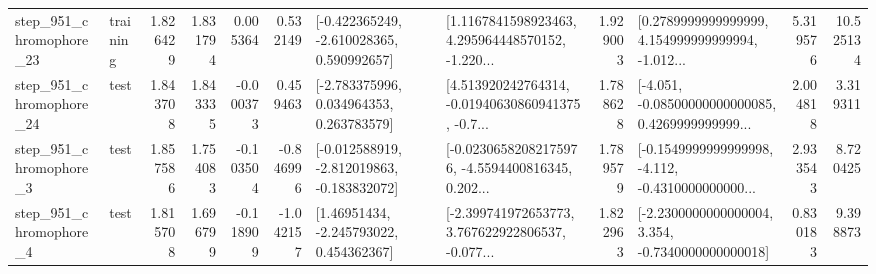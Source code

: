 \begin{tabular}{llrrrrllrlrr}
  step\_951\_chromophore\_23 &  training &      1.826429 &    1.831794 &      0.005364 &  0.532149 &   [-0.422365249, -2.610028365, 0.590992657] &  [1.1167841598923463, 4.295964448570152, -1.220... &       1.929003 &  [0.2789999999999999, 4.154999999999994, -1.012... &            5.319576 &         10.525134 \\
  step\_951\_chromophore\_24 &      test &      1.843708 &    1.843335 &     -0.000373 &  0.459463 &    [-2.783375996, 0.034964353, 0.263783579] &  [4.513920242764314, -0.01940630860941375, -0.7... &       1.788628 &  [-4.051, -0.08500000000000085, 0.4269999999999... &            2.004818 &          3.319311 \\
   step\_951\_chromophore\_3 &      test &      1.857586 &    1.754083 &     -0.103504 & -0.846996 &  [-0.012588919, -2.812019863, -0.183832072] &  [-0.02306582082175976, -4.5594400816345, 0.202... &       1.789579 &  [-0.1549999999999998, -4.112, -0.4310000000000... &            2.933543 &          8.720425 \\
   step\_951\_chromophore\_4 &      test &      1.815708 &    1.696799 &     -0.118909 & -1.042157 &     [1.46951434, -2.245793022, 0.454362367] &  [-2.399741972653773, 3.767622922806537, -0.077... &       1.822963 &  [-2.2300000000000004, 3.354, -0.7340000000000018] &            0.830183 &          9.398873 \\
\bottomrule
\end{tabular}

